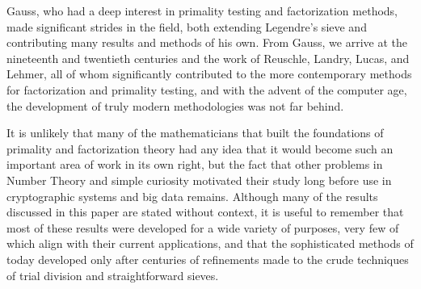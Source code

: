 \documentclass{article}
\begin{document}
\par Gauss, who had a deep interest in primality testing and factorization methods, made significant strides in the field, both extending Legendre's sieve and contributing many results and methods of his own. From Gauss, we arrive at the nineteenth and twentieth centuries and the work of Reuschle, Landry, Lucas, and Lehmer, all of whom significantly contributed to the more contemporary methods for factorization and primality testing, and with the advent of the computer age, the development of truly modern methodologies was not far behind. 
\par It is unlikely that many of the mathematicians that built the foundations of primality and factorization theory had any idea that it would become such an important area of work in its own right, but the fact that other problems in Number Theory and simple curiosity motivated their study long before use in cryptographic systems and big data remains. Although many of the results discussed in this paper are stated without context, it is useful to remember that most of these results were developed for a wide variety of purposes, very few of which align with their current applications, and that the sophisticated methods of today developed only after centuries of refinements made to the crude techniques of trial division and straightforward sieves.

 
\end{document}

